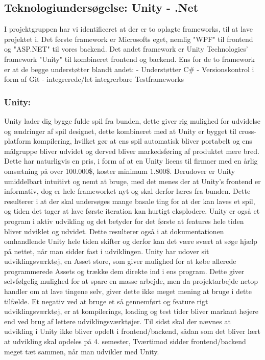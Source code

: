 \subsection{Teknologiundersøgelse: Unity - .Net}
\label{sec:unity-.net}
I projektgruppen har vi identificeret at der er to oplagte frameworks, til at lave projektet i.
Det første framework er Microsofts eget, nemlig "WPF" til frontend og "ASP.NET" til vores backend.
Det andet framework er Unity Technologies' framework "Unity" til kombineret frontend og backend.
Ens for de to framework er at de begge understøtter blandt andet:
- Understøtter C\# 
- Versionskontrol i form af Git
- integrerede/let integrerbare Testframeworks

\subsubsection{Unity:}

Unity lader dig bygge fulde spil fra bunden, dette giver rig mulighed for udvidelse og ændringer af spil designet, dette kombineret med 
at Unity er bygget til cross-platform kompilering, hvilket gør at ens spil automatisk bliver portabelt og ens målgruppe bliver udvidet og derved
bliver markedsføring af produktet mere bred. Dette har naturligvis en pris, i form af at en Unity licens til firmaer med en årlig omsætning 
på over 100.000\$, koster minimum 1.800\$.
Derudover er Unity umiddelbart intuitivt og nemt at bruge, med det menes der at Unity's frontend er informativ, 
dog er hele frameworket nyt og skal derfor læres fra bunden. Dette resulterer i at der skal undersøges mange basale ting for at der kan laves et spil,
og tiden det tager at lave første iteration kan hurtigt eksplodere. Unity er også et program i aktiv udvikling og det betyder
for det første at features hele tiden bliver udviklet og udvidet. Dette resulterer også i at dokumentationen omhandlende Unity
hele tiden skifter og derfor kan det være svært at søge hjælp på nettet, når man sidder fast i udviklingen.
Unity har udover sit udviklingsværktøj, en Asset store, som giver mulighed for at købe allerede programmerede Assets og trække dem direkte ind
i ens program. Dette giver selvfølgelig mulighed for at spare en masse arbejde, men da projektarbejde netop handler om at lave tingene selv,
giver dette ikke meget mening at bruge i dette tilfælde.
Et negativ ved at bruge et så gennemført og feature rigt udviklingsværktøj, er at kompilerings, loading og test tider bliver markant højere end
ved brug af lettere udviklingsværktøjer.
Til sidst skal der nævnes at udvikling i Unity ikke bliver opdelt i frontend/backend, sådan som det bliver lært at udvikling skal opdeles på 4. semester,
Tværtimod sidder frontend/backend meget tæt sammen, når man udvikler med Unity.\cite{Unity.com} \cite{Choose-Unity} \cite{Unity-Pros-Cons}



